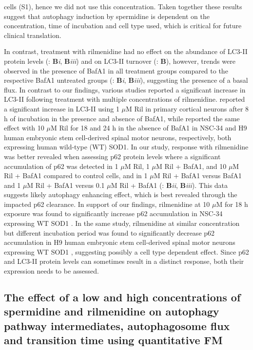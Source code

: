 {cells (S1), hence we did not use this concentration. Taken together these results suggest that autophagy induction by spermidine is dependent on the concentration, time of incubation and cell type used, which is critical for future clinical translation.

In contrast, treatment with rilmenidine had no effect on the abundance of LC3-II protein levels (: \textbf{B}\textit{i}, \textbf{B}\textit{iii}) and on LC3-II turnover (: \textbf{B}), however, trends were observed in the presence of BafA1 in all treatment groups compared to the respective BafA1 untreated groups (: \textbf{B}\textit{i}, \textbf{B}\textit{iii}), suggesting the presence of a basal flux.  In contrast to our findings, various studies reported a significant increase in LC3-II following treatment with multiple concentrations of rilmenidine. \citet{Rose2010} reported a significant increase in LC3-II using 1 $\mu$M Ril in primary cortical neurons after 8 h of incubation in the presence and absence of BafA1, while \citet{Perera2018} reported the same effect with 10 $\mu$M Ril for 18 and 24 h  in the absence of BafA1 in NSC-34 and H9 human embryonic stem cell-derived spinal motor neurons, respectively, both expressing human wild-type (WT) SOD1. In our study, response with rilmenidine was better revealed when assessing p62 protein levels where a significant accumulation of p62 was detected in 1 $\mu$M Ril, 1 $\mu$M Ril + BafA1, and 10 $\mu$M Ril + BafA1 compared to control cells, and in 1 $\mu$M Ril + BafA1 versus BafA1 and 1 $\mu$M Ril + BafA1 versus 0.1 $\mu$M Ril + BafA1 (: \textbf{B}\textit{ii}, \textbf{B}\textit{iii}). This data suggests likely autophagy enhancing effect, which is best revealed through the impacted p62 clearance. In support of our findings, rilmenidine at 10 $\mu$M for 18 h exposure was found to significantly increase p62 accumulation in NSC-34 expressing WT SOD1 \citep{Perera2018}. In the same study, rilmenidine at similar concentration but different incubation period was found to significantly decrease p62 accumulation in H9 human embryonic stem cell-derived spinal motor neurons expressing WT SOD1  \citep{Perera2018}, suggesting possibly a cell type dependent effect. Since p62 and LC3-II protein levels can sometimes result in a distinct response, both their expression needs to be assessed.

\subsection{The effect of a low and high concentrations of spermidine and rilmenidine on autophagy pathway intermediates, autophagosome flux and transition time using quantitative FM}

}
